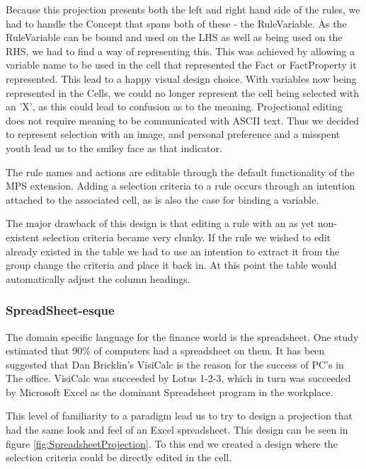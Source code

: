 Because this projection presents both the left and right hand side of the rules, we had to handle the Concept that spans both of these - the RuleVariable.
As the RuleVariable can be bound and used on the LHS as well as being used on the RHS, we had to find a way of representing this.
This was achieved by allowing a variable name to be used in the cell that represented the Fact or FactProperty it represented.
This lead to a happy visual design choice.
With variables now being represented in the Cells, we could no longer represent the cell being selected with an 'X', as this could lead to confusion as to the meaning.
Projectional editing does not require meaning to be communicated with ASCII text.
Thus we decided to represent selection with an image, and personal preference and a misspent youth lead us to the smiley face as that indicator.

The rule names and actions are editable through the default functionality of the MPS extension.
Adding a selection criteria to a rule occurs through an intention attached to the associated cell, as is also the case for binding a variable.

The major drawback of this design is that editing a rule with an as yet non-existent selection criteria became very clunky.
If the rule we wished to edit already existed in the table we had to use an intention to extract it from the group change the criteria and place it back in.
At this point the table would automatically adjust the column headings.


\subsubsection{SpreadSheet-esque}

The domain specific language for the finance world is the spreadsheet.
One study estimated that 90\% of computers had a spreadsheet on them\cite{bradley2009using}.
It has been suggested that Dan Bricklin's VisiCalc is the reason for the success of PC's in The office.
VisiCalc was succeeded by Lotus 1-2-3, which in turn was succeeded by Microsoft Excel as the dominant Spreadsheet program in the workplace.

This level of familiarity to a paradigm lead us to try to design a projection that had the same look and feel of an Excel spreadsheet.
This design can be seen in figure \ref{fig:SpreadsheetProjection}.
To this end we created a design where the selection criteria could be directly edited in the cell.

